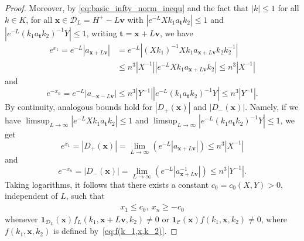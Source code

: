 \documentclass[11pt,reqno]{amsart}
\theoremstyle{definition}
\theoremstyle{remark}
\numberwithin{equation}{section}
\numberwithin{thm}{section}
\numberwithin{table}{section}
\newcommand{\x}{\mathbf{x}}
\begin{document}
\begin{proof}
      
      Moreover, by \eqref{eq:basic_infty_norm_inequ} and the fact that  $| k | \le 1$ for all $k \in K$,  for all $\x \in \mathcal{D}_{L}=H^{+}-L\mathbf{v}$ with $| e^{-L} X k_1 a_{\mathbf{t}} k_2 | \le 1$  and $|e^{-L} (k_1 a_{\mathbf{t}} k_2)^{-1} Y | \le 1$, writing $\mathbf{t}=\mathbf{x}+L\mathbf{v}$, we have 
      \begin{align*}
           e^{x_1} = 
      e^{-L}
      | a_{\mathbf{x} + L\mathbf{v}} | 
      &=
      e^{-L}| (X k_1)^{-1}X k_1 a_{\mathbf{x} + L\mathbf{v}} k_2 k_2^{-1} | \\
      &\le
      n^3 |  X^{-1} |  | e^{-L} X k_1 a_{\mathbf{x} + L\mathbf{v}} k_2  | \le n^3 |  X^{-1} |
      \end{align*}
      and 
      \[
      e^{-x_n} = 
      e^{-L} |a_{\mathbf{-x} - L\mathbf{v}} | 
      \le n^3
      | Y^{-1} |
      | e^{-L}(k_1 a_{\mathbf{t}} k_2)^{-1} Y  | \le  n^3
      | Y^{-1} |.
      \]
       By continuity, analogous bounds hold for $|D_+(\x)|$ and 
      $|D_-(\x)|$. Namely, if we have  $\limsup_{L \to \infty}| e^{-L} X k_1 a_{\mathbf{t}} k_2 | \le 1$  and $\limsup_{L \to \infty}|e^{-L} (k_1 a_{\mathbf{t}} k_2)^{-1} Y | \le 1$, we get 
      \[
      e^{x_1}=
      |D_+(\x)| = \lim_{L\to \infty} ( e^{-L} |a_{\mathbf{x}+  L\mathbf{v}}|) \le n^3|X^{-1}|
      \]
      and 
      \[
      e^{-x_n}=
       |D_-(\x)| = \lim_{L\to \infty} ( e^{-L} |a^{-1}_{\mathbf{x}+  L\mathbf{v}}|) \le n^3|Y^{-1}|.
      \]
    Taking logarithms, it follows that there exists a constant $c_0 = c_0(X,Y) > 0$, independent of $L$, such that 
    \begin{align} \label{eq:suppboundforf}
        x_1 \le c_0, \ x_n \ge - c_0 
    \end{align}
    whenever $\mathbf{1}_{\mathcal{D}_{L}}(\x)f_L(k_1,\mathbf x+L\mathbf{v},k_2)\neq0$ or
$\mathbf{1}_{\mathcal{C}}(\x)f(k_1,\mathbf x,k_2)\neq0$, where $f(k_1,\mathbf x,k_2)$ is defined by~\eqref{eq:f(k_1,x,k_2)}.



\end{proof}
\end{document}
